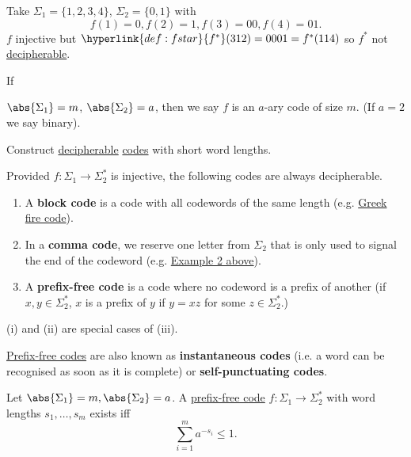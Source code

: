 \documentclass{article}
\newcommand{\1}[1]{\mathbbm{1}_{#1}}
\begin{document}

\begin{eg}
    Take $\Sigma_1 = \{1, 2, 3, 4\}$, $\Sigma_2 = \{0, 1\}$ with
    \begin{equation*}
        f(1) = 0, f(2) = 1, f(3) = 00, f(4) = 01.
    \end{equation*}
    $f$ injective but $\hyperlink{def:fstar}{f^*}(312) = 0001 = f^*(114)$ so $f^*$ not \hyperlink{def:decipherable}{decipherable}.
\end{eg}

\begin{notation}
    \hypertarget{def:aary}{If} $\abs{\Sigma_1} = m$, $\abs{\Sigma_2} = a$, then we say $f$ is an $a$-ary code of size $m$. (If $a=2$ we say binary).
\end{notation}
\begin{aim}
    Construct \hyperlink{def:decipherable}{decipherable} \hyperlink{def:code}{codes} with short word lengths.
\end{aim}

Provided $f: \Sigma_1 \to \Sigma_2^*$ is injective, the following codes are always decipherable.
\begin{enumerate}[label=(\roman*)]
    \item A \textbf{block code} is a code with all codewords of the same length (e.g. \hyperlink{eg:greekFire}{Greek fire code}).
    \item In a \textbf{comma code}, we reserve one letter from $\Sigma_2$ that is only used to signal the end of the codeword (e.g. \hyperlink{ex:comma-code}{Example 2 above}).
    \item A \hypertarget{def:prefixFreeCode}{\textbf{prefix-free code}} is a code where no codeword is a prefix of another (if $x, y \in \Sigma_2^*$, $x$ is a prefix of $y$ if $y=xz$ for some $z \in \Sigma_2^*$.)
\end{enumerate}

\begin{remark}(i) and (ii) are special cases of (iii).
\end{remark}

\hyperlink{def:prefixFreeCode}{Prefix-free codes} are also known as \textbf{instantaneous codes} (i.e. a word can be recognised as soon as it is complete) or \textbf{self-punctuating codes}.

\begin{nthm}\label{thm:kraft}
    Let $\abs{\Sigma_1} = m, \abs{\Sigma_2} = a$. A \hyperlink{def:prefixFreeCode}{prefix-free code} $f: \Sigma_1 \to \Sigma_2^*$ with word lengths $s_1, \dotsc, s_m$ exists iff
    \begin{equation*}
        \sum_{i = 1}^m a^{-s_i} \leq 1.
    \end{equation*}
\end{nthm}
\end{document}
